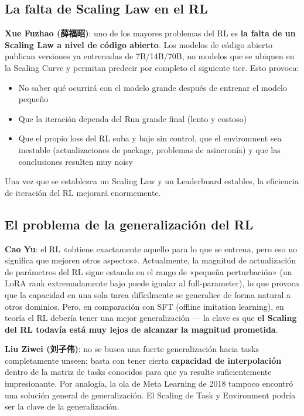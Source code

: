 \documentclass[a4paper]{article}
\begin{document}
\subsection{La falta de Scaling Law en el RL}

\textbf{Xue Fuzhao (薛福昭)}: uno de los mayores problemas del RL es \textbf{la falta de un Scaling Law a nivel de código abierto}. Los modelos de código abierto publican versiones ya entrenadas de 7B/14B/70B, no modelos que se ubiquen en la Scaling Curve y permitan predecir por completo el siguiente tier. Esto provoca:
\begin{itemize}
  \item No saber qué ocurrirá con el modelo grande después de entrenar el modelo pequeño
  \item Que la iteración dependa del Run grande final (lento y costoso)
  \item Que el propio loss del RL suba y baje sin control, que el environment sea inestable (actualizaciones de package, problemas de asincronía) y que las conclusiones resulten muy noisy
\end{itemize}
Una vez que se establezca un Scaling Law y un Leaderboard estables, la eficiencia de iteración del RL mejorará enormemente.

\subsection{El problema de la generalización del RL}

\textbf{Cao Yu}: el RL «obtiene exactamente aquello para lo que se entrena, pero eso no significa que mejoren otros aspectos». Actualmente, la magnitud de actualización de parámetros del RL sigue estando en el rango de «pequeña perturbación» (un LoRA rank extremadamente bajo puede igualar al full-parameter), lo que provoca que la capacidad en una sola tarea difícilmente se generalice de forma natural a otros dominios. Pero, en comparación con SFT (offline imitation learning), en teoría el RL debería tener una mejor generalización — la clave es que \textbf{el Scaling del RL todavía está muy lejos de alcanzar la magnitud prometida}.

\textbf{Liu Ziwei (刘子伟)}: no se busca una fuerte generalización hacia tasks completamente unseen; basta con tener cierta \textbf{capacidad de interpolación} dentro de la matriz de tasks conocidos para que ya resulte suficientemente impresionante. Por analogía, la ola de Meta Learning de 2018 tampoco encontró una solución general de generalización. El Scaling de Task y Environment podría ser la clave de la generalización.
\end{document}

